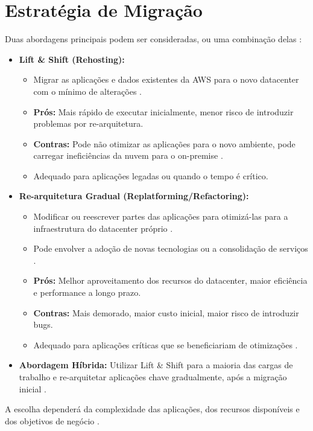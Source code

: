 \documentclass[
	12pt,				%
	oneside,			%
	a4paper,			%
	english,			%
	brazil				%
	]{abntex2unama}
\begin{document}
\section{Estratégia de Migração}
Duas abordagens principais podem ser consideradas, ou uma combinação delas \cite{datacenter_automation}:
\begin{itemize}
	\item \textbf{Lift \& Shift (Rehosting):}
	      \begin{itemize}
		      \item Migrar as aplicações e dados existentes da AWS para o novo datacenter com o mínimo de alterações \cite{cloud_infrastructure}.
		      \item \textbf{Prós:} Mais rápido de executar inicialmente, menor risco de introduzir problemas por re-arquitetura.
		      \item \textbf{Contras:} Pode não otimizar as aplicações para o novo ambiente, pode carregar ineficiências da nuvem para o on-premise \cite{containerization}.
		      \item Adequado para aplicações legadas ou quando o tempo é crítico.
	      \end{itemize}
	\item \textbf{Re-arquitetura Gradual (Replatforming/Refactoring):}
	      \begin{itemize}
		      \item Modificar ou reescrever partes das aplicações para otimizá-las para a infraestrutura do datacenter próprio \cite{software_defined}.
		      \item Pode envolver a adoção de novas tecnologias ou a consolidação de serviços \cite{ai_automation}.
		      \item \textbf{Prós:} Melhor aproveitamento dos recursos do datacenter, maior eficiência e performance a longo prazo.
		      \item \textbf{Contras:} Mais demorado, maior custo inicial, maior risco de introduzir bugs.
		      \item Adequado para aplicações críticas que se beneficiariam de otimizações \cite{capacity_planning}.
	      \end{itemize}
	\item \textbf{Abordagem Híbrida:} Utilizar Lift \& Shift para a maioria das cargas de trabalho e re-arquitetar aplicações chave gradualmente, após a migração inicial \cite{containerization}.
\end{itemize}
A escolha dependerá da complexidade das aplicações, dos recursos disponíveis e dos objetivos de negócio \cite{design_principles}.
\end{document}
